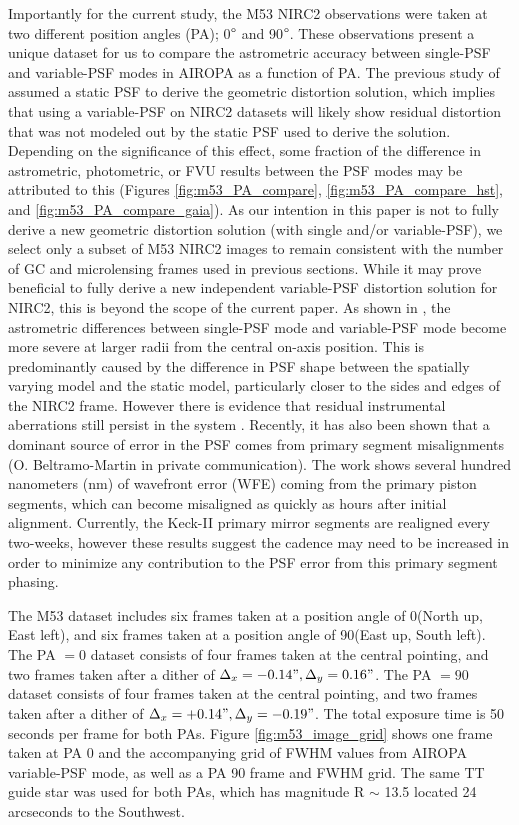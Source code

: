 \documentclass[]{spie}  %
\begin{document}
Importantly for the current study, the M53 NIRC2 observations were taken at two different position angles (PA); 0$\degree$ and 90$\degree$. These observations present a unique dataset for us to compare the astrometric accuracy between single-PSF and variable-PSF modes in AIROPA as a function of PA. The previous study of \cite{service:2016a} assumed a static PSF to derive the geometric distortion solution, which implies that using a variable-PSF on NIRC2 datasets will likely show residual distortion that was not modeled out by the static PSF used to derive the solution. Depending on the significance of this effect, some fraction of the difference in astrometric, photometric, or FVU results between the PSF modes may be attributed to this (Figures \ref{fig:m53_PA_compare}, \ref{fig:m53_PA_compare_hst}, and \ref{fig:m53_PA_compare_gaia}). As our intention in this paper is not to fully derive a new geometric distortion solution (with single and/or variable-PSF), we select only a subset of M53 NIRC2 images to remain consistent with the number of GC and microlensing frames used in previous sections. While it may prove beneficial to fully derive a new independent variable-PSF distortion solution for NIRC2, this is beyond the scope of the current paper. As shown in \cite{Turri:inprep}, the astrometric differences between single-PSF mode and variable-PSF mode become more severe at larger radii from the central on-axis position. This is predominantly caused by the difference in PSF shape between the spatially varying model and the static model, particularly closer to the sides and edges of the NIRC2 frame. However there is evidence that residual instrumental aberrations still persist in the system \cite{Turri:inprep}. Recently, it has also been shown that a dominant source of error in the PSF comes from primary segment misalignments (O. Beltramo-Martin in private communication). The work shows several hundred nanometers (nm) of wavefront error (WFE) coming from the primary piston segments, which can become misaligned as quickly as hours after initial alignment. Currently, the Keck-II primary mirror segments are realigned every two-weeks, however these results suggest the cadence may need to be increased in order to minimize any contribution to the PSF error from this primary segment phasing.

The M53 dataset includes six frames taken at a position angle of 0\degree (North up, East left), and six frames taken at a position angle of 90\degree (East up, South left). The PA $=0$ dataset consists of four frames taken at the central pointing, and two frames taken after a dither of $\Delta_x = -0.14", \Delta_y = 0.16"$. The PA $=90$ dataset consists of four frames taken at the central pointing, and two frames taken after a dither of $\Delta_x = +0.14", \Delta_y = -0.19"$. The total exposure time is 50 seconds per frame for both PAs. Figure \ref{fig:m53_image_grid} shows one frame taken at PA 0 and the accompanying grid of FWHM values from AIROPA variable-PSF mode, as well as a PA 90 frame and FWHM grid. The same TT guide star was used for both PAs, which has magnitude R ${\sim}$ 13.5 located 24 arcseconds to the Southwest.
\end{document}
